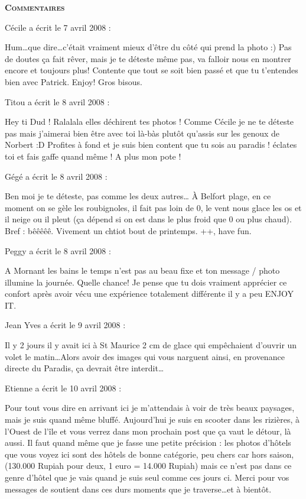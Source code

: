 \bigskip
\textbf{\textsc{Commentaires}}

\medskip
Cécile a écrit le 7 avril 2008 :
\begin{displayquote}
Hum\dots que dire\dots c'était vraiment mieux d'être du côté qui prend la photo :) Pas de doutes ça fait rêver, mais je te déteste même pas, va falloir nous en montrer encore et toujours plus!
Contente que tout se soit bien passé et que tu t'entendes bien avec Patrick. Enjoy!
Gros bisous.
\end{displayquote}

\medskip
Titou a écrit le 8 avril 2008 :
\begin{displayquote}
Hey ti Dud !
Ralalala elles déchirent tes photos ! Comme Cécile je ne te déteste pas mais j'aimerai bien être avec toi là-bàs plutôt qu'assis sur les genoux de Norbert :D
Profites à fond et je suis bien content que tu sois au paradis ! éclates toi et fais gaffe quand même !
A plus mon pote !
\end{displayquote}

\medskip
Gégé a écrit le 8 avril 2008 :
\begin{displayquote}
Ben moi je te déteste, pas comme les deux autres\dots
À Belfort plage, en ce moment on se gèle les roubignoles, il fait pas loin de 0, le vent nous glace les os et il neige ou il pleut (ça dépend si on est dans le plus froid que 0 ou plus chaud). Bref : bêêêêê.
Vivement un chtiot bout de printemps.
++, have fun.
\end{displayquote}

\medskip
Peggy a écrit le 8 avril 2008 :
\begin{displayquote}
A Mornant les bains le temps n'est pas au beau fixe et ton message / photo illumine la journée.
Quelle chance!
Je pense que tu dois vraiment apprécier ce confort après avoir vécu une expérience totalement différente il y a peu
ENJOY IT.
\end{displayquote}

\medskip
Jean Yves a écrit le 9 avril 2008 :
\begin{displayquote}
Il y 2 jours il y avait ici à St Maurice 2 cm de glace qui empêchaient d'ouvrir un volet le matin\dots Alors avoir des images qui vous narguent ainsi, en provenance directe du Paradis, ça devrait être interdit\dots
\end{displayquote}

\medskip
Etienne a écrit le 10 avril 2008 :
\begin{displayquote}
Pour tout vous dire en arrivant ici je m'attendais à voir de très beaux paysages, mais je suis quand même bluffé.
Aujourd'hui je suis en scooter dans les rizières, à l'Ouest de l'île et vous verrez dans mon prochain post que ça vaut le détour, là aussi.
Il faut quand même que je fasse une petite précision : les photos d'hôtels que vous voyez ici sont des hôtels de bonne catégorie, peu chers car hors saison, (130.000 Rupiah pour deux, 1 euro = 14.000 Rupiah) mais ce n'est pas dans ce genre d'hôtel que je vais quand je suis seul comme ces jours ci.
Merci pour vos messages de soutient dans ces durs moments que je traverse\dots et à bientôt.
\end{displayquote}

